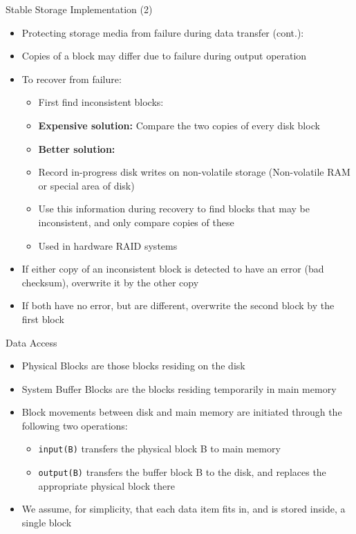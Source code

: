 \documentclass[aspectratio=169, xcolor=dvipsnames]{beamer}
\begin{document}
\begin{frame}{Stable Storage Implementation (2)}
    \begin{itemize}[<+->]
        \item Protecting storage media from failure during data transfer (cont.):
        \item Copies of a block may differ due to failure during output operation
        \item To recover from failure:
        \begin{itemize}
            \item[$\triangleright$] First find inconsistent blocks:
            \item[$\triangleright$] \textbf{Expensive solution:} Compare the two copies of every disk block
            \item[$\triangleright$] \textbf{Better solution:} 
            \item[$\bullet$] Record in-progress disk writes on non-volatile storage (Non-volatile RAM or special area of disk)
            \item[$\bullet$] Use this information during recovery to find blocks that may be inconsistent, and only compare copies of these
            \item[$\bullet$] Used in hardware RAID systems
        \end{itemize}
        \item If either copy of an inconsistent block is detected to have an error (bad checksum), overwrite it by the other copy
        \item If both have no error, but are different, overwrite the second block by the first block
    \end{itemize}
\end{frame}

\begin{frame}{Data Access}
    \begin{itemize}[<+->]
        \item Physical Blocks are those blocks residing on the disk
        \item System Buffer Blocks are the blocks residing temporarily in main memory
        \item Block movements between disk and main memory are initiated through the following two operations:
        \begin{itemize}
            \item[$\triangleright$] \texttt{input(B)} transfers the physical block B to main memory
            \item[$\triangleright$] \texttt{output(B)} transfers the buffer block B to the disk, and replaces the appropriate physical block there
        \end{itemize}
        \item We assume, for simplicity, that each data item fits in, and is stored inside, a single block
    \end{itemize}
\end{frame}
\end{document}
